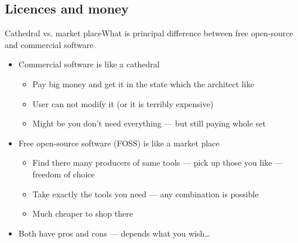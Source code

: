 \documentclass[compress, ucs, xelatex, 11pt, xcolor=svgnames,
  hyperref={
    bookmarks=true,
    unicode=true,
    colorlinks=true,
    pdftitle={Linux, command line and MetaCentrum},
    plainpages=false,
    pdfauthor={Vojtech Zeisek},
    pdfsubject={Course about use of Linux command line, writing shell scripts and using MetaCentrum of CESNET},
    pdfcreator={XeLaTeX, http://www.xelatex.org/},
    pdfkeywords={Linux, GNU, BASH, shell, command line, MetaCentrum},
    linkcolor=Sienna,
    anchorcolor=black,
    citecolor=green,
    filecolor=magenta,
    menucolor=Sienna,
    urlcolor=cyan,
    pdftex},
  url={hyphens, lowtilde} %
  ]{beamer}
\begin{document}
\subsection{Licences and money}

\begin{frame}{Cathedral vs. market place}{What is principal difference between free open-source and commercial software}
\begin{itemize}
  \item Commercial software is like a cathedral
  \begin{itemize}
    \item Pay big money and get it in the state which the architect like
    \item User can not modify it (or it is terribly expensive)
    \item Might be you don't need everything --- but still paying whole set
  \end{itemize}
  \item Free open-source software (FOSS) is like a market place
  \begin{itemize}
    \item Find there many producers of same tools --- pick up those you like --- freedom of choice
    \item Take exactly the tools you need --- any combination is possible
    \item Much cheaper to shop there
  \end{itemize}
  \item Both have pros and cons --- depends what you wish\ldots
\end{itemize}
\end{frame}
\end{document}
